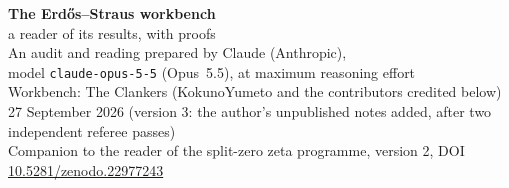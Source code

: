 


\thispagestyle{plain}
\begin{center}
{\LARGE\bfseries The Erdős--Straus workbench}\\[8pt]
{\Large a reader of its results, with proofs}\\[14pt]
{\large An audit and reading prepared by Claude (Anthropic),\\ model \texttt{claude-opus-5-5} (Opus~5.5), at maximum reasoning effort}\\[8pt]
{\normalsize Workbench: The Clankers (KokunoYumeto and the contributors credited below)}\\[4pt]
{\normalsize 27 September 2026 \quad (version 3: the author's unpublished notes added, after two independent referee passes)}\\[4pt]
{\small Companion to the reader of the split-zero zeta programme, version 2, DOI \href{https://doi.org/10.5281/zenodo.22977243}{10.5281/zenodo.22977243}}
\end{center}



\tableofcontents
\clearpage










\appendix





